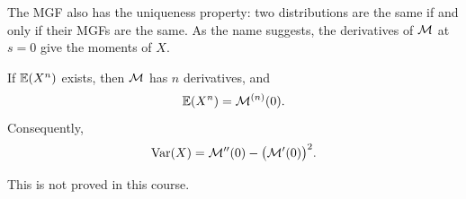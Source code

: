 The MGF also has the uniqueness property: two distributions are the same if and only if their MGFs are the same. As the name suggests, the derivatives of $\mathcal{M}$ at $s = 0$ give the moments of $X$.

\begin{theorem}\label{thm:mgf-moments}
If $\operatorname{\mathbb{E}}(X^n)$ exists, then $\mathcal{M}$ has $n$ derivatives, and
\[
  \operatorname{\mathbb{E}}(X^n) = \mathcal{M}^{(n)}(0).
\]
Consequently,
\[
  \operatorname{Var}(X) = \mathcal{M}''(0) - \bigl(\mathcal{M}'(0)\bigr)^2.
\]
\end{theorem}

This is not proved in this course.
